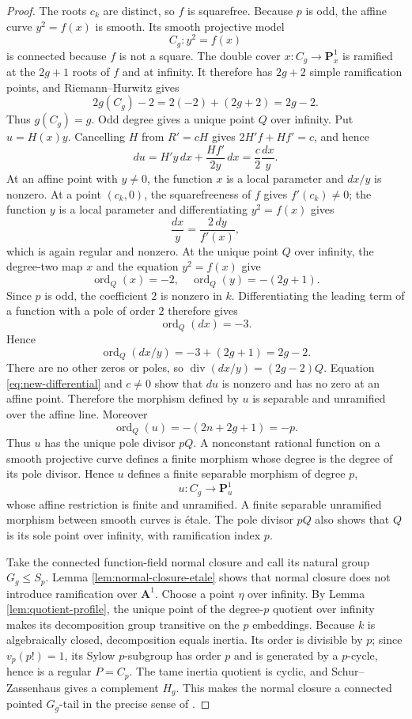 \documentclass[10pt,a4paper]{amsart}
\numberwithin{equation}{section}
\begin{document}
\begin{proof}
The roots $c_k$ are distinct, so $f$ is squarefree.  Because $p$ is odd, the
affine curve $y^2=f(x)$ is smooth.  Its smooth projective model
\[
 C_g:y^2=f(x)
\]
is connected because $f$ is not a square.  The double cover
$x:C_g\to\mathbf P^1_x$ is ramified at the $2g+1$ roots of $f$ and at
infinity.  It therefore has $2g+2$ simple ramification points, and
Riemann--Hurwitz gives
\[
 2g(C_g)-2=2(-2)+(2g+2)=2g-2.
\]
Thus $g(C_g)=g$.  Odd degree gives a unique point $Q$ over infinity.  Put
$u=H(x)y$.  Cancelling $H$ from $R'=cH$ gives
$2H'f+Hf'=c$, and hence
\[
 du=H'y\,dx+\frac{Hf'}{2y}\,dx
   =\frac{c}{2}\frac{dx}{y}.
 \label{eq:new-differential}
\]
At an affine point with $y\ne0$, the function $x$ is a local parameter and
$dx/y$ is nonzero.  At a point $(c_k,0)$, the squarefreeness of $f$ gives
$f'(c_k)\ne0$; the function $y$ is a local parameter and differentiating
$y^2=f(x)$ gives
\[
 \frac{dx}{y}=\frac{2\,dy}{f'(x)},
\]
which is again regular and nonzero.  At the unique point $Q$ over infinity,
the degree-two map $x$ and the equation $y^2=f(x)$ give
\[
 \operatorname{ord}_Q(x)=-2,\quad
 \operatorname{ord}_Q(y)=-(2g+1).
\]
Since $p$ is odd, the coefficient $2$ is nonzero in $k$.  Differentiating
the leading term of a function with a pole of order $2$ therefore gives
\[
 \operatorname{ord}_Q(dx)=-3.
\]
Hence
\[
 \operatorname{ord}_Q(dx/y)=-3+(2g+1)=2g-2.
\]
There are no other zeros or poles, so
$\operatorname{div}(dx/y)=(2g-2)Q$.  Equation
\eqref{eq:new-differential} and $c\ne0$ show that $du$ is nonzero and has no
zero at an affine point.  Therefore the morphism defined by $u$ is separable
and unramified over the affine line.  Moreover
\[
 \operatorname{ord}_Q(u)=-(2n+2g+1)=-p.
\]
Thus $u$ has the unique pole divisor $pQ$.  A nonconstant rational function
on a smooth projective curve defines a finite morphism whose degree is the
degree of its pole divisor.  Hence $u$ defines a finite separable morphism of
degree $p$,
\[
 u:C_g\longrightarrow\mathbf P^1_u
 \label{eq:new-map}
\]
whose affine restriction is finite and unramified.  A finite separable
unramified morphism between smooth curves is \'etale.  The pole divisor
$pQ$ also shows that $Q$ is its sole point over infinity, with ramification
index $p$.

Take the connected function-field normal closure and call its natural group
$G_g\leq S_p$.  Lemma \ref{lem:normal-closure-etale} shows that normal
closure does not introduce ramification over $\mathbf A^1$.  Choose a point
$\eta$ over infinity.  By Lemma \ref{lem:quotient-profile}, the unique point
of the degree-$p$ quotient over infinity makes its decomposition group
transitive on the $p$ embeddings.  Because $k$ is algebraically closed,
decomposition equals inertia.  Its order is divisible by $p$; since
$v_p(p!)=1$, its Sylow $p$-subgroup has order $p$ and is generated by a
$p$-cycle, hence is a regular $P=C_p$.  The tame inertia quotient is cyclic,
and Schur--Zassenhaus gives a complement $H_g$.  This makes the normal
closure a connected pointed
$G_g$-tail in the precise sense of
\cite[Definition 2.9]{WewersThree}.


\end{proof}
\end{document}
